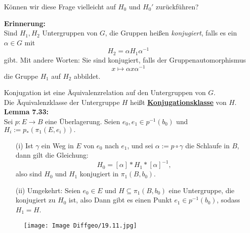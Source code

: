 \documentclass[fleqn, 12pt, letterpaper]{article}
\begin{document}
Können wir diese Frage vielleicht auf \( H_0 \) und \( H_0' \) zurückführen?

\vspace{1em}
\textbf{Erinnerung:} \\
Sind \( H_1, H_2 \) Untergruppen von \( G \), die Gruppen heißen \emph{konjugiert}, falls es ein \( \alpha \in G \) mit
\[
H_2 = \alpha H_1 \alpha^{-1}
\]
gibt. Mit andere Worten: Sie sind konjugiert, falls der Gruppenautomorphismus
\[
x \mapsto \alpha x\alpha^{-1}
\]
die Gruppe \( H_1 \) auf \( H_2 \) abbildet.

Konjugation ist eine Äquivalenzrelation auf den Untergruppen von \( G \). \\
Die Äquivalenzklasse der Untergruppe \( H \) heißt \textbf{\underline{Konjugationsklasse}} von \( H \).\\

\textbf{Lemma 7.33:} \\
Sei \( p : E \to B \) eine Überlagerung. Seien \( e_0, e_1 \in p^{-1}(b_0) \) und
\(
H_i := p_*\left( \pi_1(E, e_i) \right).
\)

\begin{enumerate}
    \item[(i)] Ist \( \gamma \) ein Weg in \( E \) von \( e_0 \) nach \( e_1 \), und sei \( \alpha := p \circ \gamma \) die Schlaufe in \( B \), dann gilt die Gleichung:
    \[
    H_0 = [\alpha]* H_1* [\alpha]^{-1},
    \]
    also sind \( H_0 \) und \( H_1 \) konjugiert in \( \pi_1(B, b_0) \).
    
    \item[(ii)] Umgekehrt: Seien \( e_0 \in E \) und \( H \subseteq \pi_1(B, b_0) \) eine Untergruppe, die konjugiert zu \( H_0  \) ist, also
    Dann gibt es einen Punkt \( e_1 \in p^{-1}(b_0) \), sodass \( H_1=H \).
\end{enumerate}
  \begin{figure}[H]
    \centering
    \texttt{[image: Image Diffgeo/19.11.jpg]}
 \end{figure}
\end{document}
